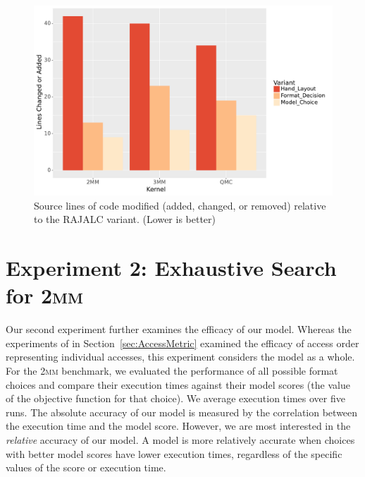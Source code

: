 \documentclass[sigconf,review=true]{acmart}
\begin{document}
\begin{figure}
	\includegraphics[width=\columnwidth]{sloc.pdf}
	\caption{Source lines of code modified (added, changed, or removed) relative to the  RAJALC variant. (Lower is better)}
	\label{PolybenchSLOC}  
\end{figure}


\section{Experiment 2: Exhaustive Search for \textsc{2mm}}

Our second experiment further examines the efficacy of our model. 
Whereas the experiments of in Section~\ref{sec:AccessMetric} examined the efficacy of access order representing individual accesses, this experiment considers the model as a whole.
For the \textsc{2mm} benchmark, we evaluated the performance of all possible format choices and compare their execution times against their model scores (the value of the objective function for that choice).
We average execution times over five runs.
The absolute accuracy of our model is measured by the correlation between the execution time and the model score.
However, we are most interested in the \textit{relative} accuracy of our model.
A model is more relatively accurate when choices with better model scores have lower execution times, regardless of the specific values of the score or execution time.
\end{document}
